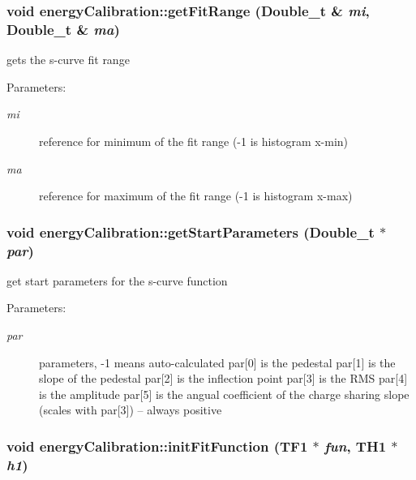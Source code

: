 \subsubsection{\setlength{\rightskip}{0pt plus 5cm}void energy\-Calibration::get\-Fit\-Range (Double\_\-t \& {\em mi}, Double\_\-t \& {\em ma})\hspace{0.3cm}{\tt  [inline]}}\label{classenergyCalibration_bfb02327a6897bd97525c01697a1ba4f}


gets the s-curve fit range \begin{Desc}
\item[Parameters:]
\begin{description}
\item[{\em mi}]reference for minimum of the fit range (-1 is histogram x-min) \item[{\em ma}]reference for maximum of the fit range (-1 is histogram x-max) \end{description}
\end{Desc}
\subsubsection{\setlength{\rightskip}{0pt plus 5cm}void energy\-Calibration::get\-Start\-Parameters (Double\_\-t $\ast$ {\em par})}\label{classenergyCalibration_fc7411b7a3191748dfcc90f86b823bf4}


get start parameters for the s-curve function \begin{Desc}
\item[Parameters:]
\begin{description}
\item[{\em par}]parameters, -1 means auto-calculated par[0] is the pedestal par[1] is the slope of the pedestal par[2] is the inflection point par[3] is the RMS par[4] is the amplitude par[5] is the angual coefficient of the charge sharing slope (scales with par[3]) -- always positive \end{description}
\end{Desc}
\subsubsection{\setlength{\rightskip}{0pt plus 5cm}void energy\-Calibration::init\-Fit\-Function (TF1 $\ast$ {\em fun}, TH1 $\ast$ {\em h1})\hspace{0.3cm}{\tt  [private]}}\label{classenergyCalibration_3e84328c11772b6263224340ec924e37}


